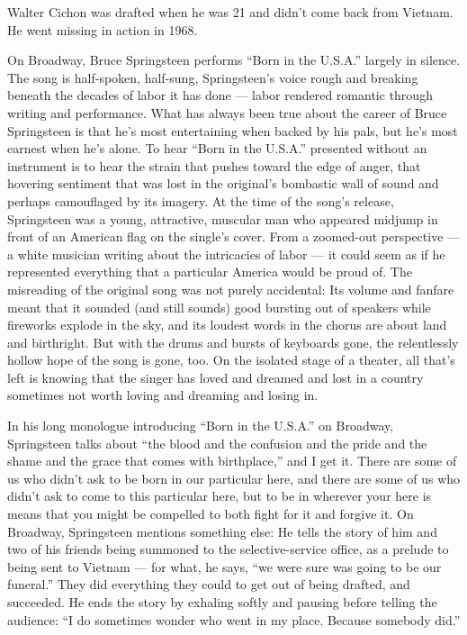 Walter Cichon was drafted when he was 21 and didn't come back from
Vietnam. He went missing in action in 1968.

On Broadway, Bruce Springsteen performs ``Born in the U.S.A.'' largely
in silence. The song is half-spoken, half-sung, Springsteen's voice
rough and breaking beneath the decades of labor it has done --- labor
rendered romantic through writing and performance. What has always been
true about the career of Bruce Springsteen is that he's most
entertaining when backed by his pals, but he's most earnest when he's
alone. To hear ``Born in the U.S.A.'' presented without an instrument is
to hear the strain that pushes toward the edge of anger, that hovering
sentiment that was lost in the original's bombastic wall of sound and
perhaps camouflaged by its imagery. At the time of the song's release,
Springsteen was a young, attractive, muscular man who appeared midjump
in front of an American flag on the single's cover. From a zoomed-out
perspective --- a white musician writing about the intricacies of labor
--- it could seem as if he represented everything that a particular
America would be proud of. The misreading of the original song was not
purely accidental: Its volume and fanfare meant that it sounded (and
still sounds) good bursting out of speakers while fireworks explode in
the sky, and its loudest words in the chorus are about land and
birthright. But with the drums and bursts of keyboards gone, the
relentlessly hollow hope of the song is gone, too. On the isolated stage
of a theater, all that's left is knowing that the singer has loved and
dreamed and lost in a country sometimes not worth loving and dreaming
and losing in.

In his long monologue introducing ``Born in the U.S.A.'' on Broadway,
Springsteen talks about ``the blood and the confusion and the pride and
the shame and the grace that comes with birthplace,'' and I get it.
There are some of us who didn't ask to be born in our particular here,
and there are some of us who didn't ask to come to this particular here,
but to be in wherever your here is means that you might be compelled to
both fight for it and forgive it. On Broadway, Springsteen mentions
something else: He tells the story of him and two of his friends being
summoned to the selective-service office, as a prelude to being sent to
Vietnam --- for what, he says, ``we were sure was going to be our
funeral.'' They did everything they could to get out of being drafted,
and succeeded. He ends the story by exhaling softly and pausing before
telling the audience: ``I do sometimes wonder who went in my place.
Because somebody did.''


